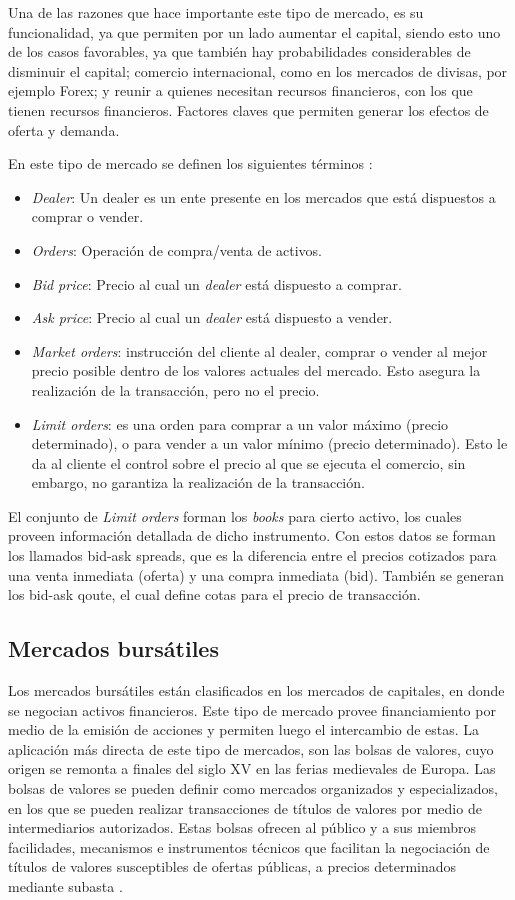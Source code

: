 Una de las razones que hace importante este tipo de mercado, es su funcionalidad, ya que permiten por un lado aumentar el capital, siendo esto uno 
de los casos favorables, ya que también hay probabilidades considerables de disminuir el capital; comercio internacional, como en los mercados de 
divisas, por ejemplo Forex; y reunir a quienes necesitan recursos financieros, con los que tienen recursos financieros. Factores claves
que permiten generar los efectos de oferta y demanda.

En este tipo de mercado se definen los siguientes términos \cite{nevmyvaka2003electronic}:
\begin{itemize}
	\item \emph{Dealer}: Un dealer es un ente presente en los mercados que está dispuestos a comprar o vender.
	\item \emph{Orders}: Operación de compra/venta de activos.
	\item \emph{Bid price}: Precio al cual un \emph{dealer} está dispuesto a comprar.
	\item \emph{Ask price}: Precio al cual un \emph{dealer} está dispuesto a vender.
	\item \emph{Market orders}: instrucción del cliente al dealer, comprar o vender al mejor precio posible dentro de los valores actuales del mercado.
		Esto asegura la realización de la transacción, pero no el precio.
	\item \emph{Limit orders}: es una orden para comprar a un valor máximo (precio determinado), o para vender a un valor mínimo (precio determinado).
		Esto le da al cliente el control sobre el precio al que se ejecuta el comercio, sin embargo, no garantiza la realización de la transacción.
\end{itemize}

El conjunto de \emph{Limit orders} forman los \emph{books} para cierto activo, los cuales proveen información detallada de dicho instrumento. Con estos datos
se forman los llamados bid-ask spreads, que es la diferencia entre el precios cotizados para una venta inmediata (oferta) y una compra inmediata (bid). 
También se generan los bid-ask qoute, el cual define cotas para el precio de transacción.

\subsection{Mercados bursátiles}
Los mercados bursátiles están clasificados en los mercados de capitales, en donde se negocian activos financieros. Este tipo de mercado provee financiamiento
por medio de la emisión de acciones y permiten luego el intercambio de estas. La aplicación más directa de este tipo de mercados, son las bolsas de valores, cuyo
origen se remonta a finales del siglo XV en las ferias medievales de Europa. Las bolsas de valores se pueden definir como mercados organizados y especializados, en 
los que se pueden realizar transacciones de títulos de valores por medio de intermediarios autorizados. Estas bolsas ofrecen al público y a sus miembros facilidades, 
mecanismos e instrumentos técnicos que facilitan la negociación de títulos de valores susceptibles de ofertas públicas, a precios determinados mediante subasta \cite{levine1998stock}.

